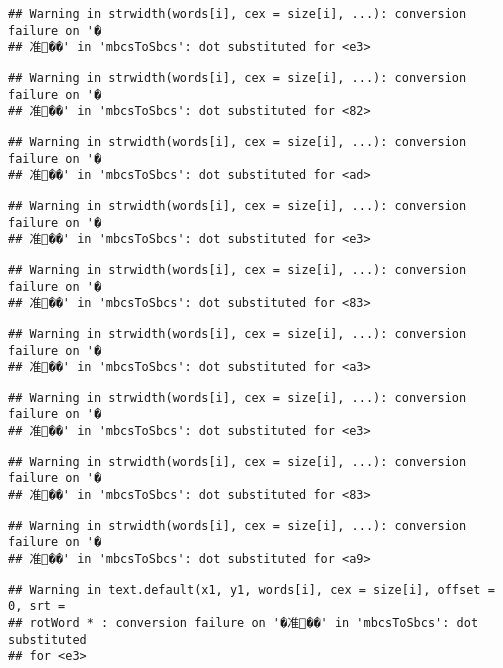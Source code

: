 \documentclass[]{article}
\begin{document}
\begin{verbatim}
## Warning in strwidth(words[i], cex = size[i], ...): conversion failure on '�
## 准��' in 'mbcsToSbcs': dot substituted for <e3>
\end{verbatim}

\begin{verbatim}
## Warning in strwidth(words[i], cex = size[i], ...): conversion failure on '�
## 准��' in 'mbcsToSbcs': dot substituted for <82>
\end{verbatim}

\begin{verbatim}
## Warning in strwidth(words[i], cex = size[i], ...): conversion failure on '�
## 准��' in 'mbcsToSbcs': dot substituted for <ad>
\end{verbatim}

\begin{verbatim}
## Warning in strwidth(words[i], cex = size[i], ...): conversion failure on '�
## 准��' in 'mbcsToSbcs': dot substituted for <e3>
\end{verbatim}

\begin{verbatim}
## Warning in strwidth(words[i], cex = size[i], ...): conversion failure on '�
## 准��' in 'mbcsToSbcs': dot substituted for <83>
\end{verbatim}

\begin{verbatim}
## Warning in strwidth(words[i], cex = size[i], ...): conversion failure on '�
## 准��' in 'mbcsToSbcs': dot substituted for <a3>
\end{verbatim}

\begin{verbatim}
## Warning in strwidth(words[i], cex = size[i], ...): conversion failure on '�
## 准��' in 'mbcsToSbcs': dot substituted for <e3>
\end{verbatim}

\begin{verbatim}
## Warning in strwidth(words[i], cex = size[i], ...): conversion failure on '�
## 准��' in 'mbcsToSbcs': dot substituted for <83>
\end{verbatim}

\begin{verbatim}
## Warning in strwidth(words[i], cex = size[i], ...): conversion failure on '�
## 准��' in 'mbcsToSbcs': dot substituted for <a9>
\end{verbatim}

\begin{verbatim}
## Warning in text.default(x1, y1, words[i], cex = size[i], offset = 0, srt =
## rotWord * : conversion failure on '�准��' in 'mbcsToSbcs': dot substituted
## for <e3>
\end{verbatim}
\end{document}
